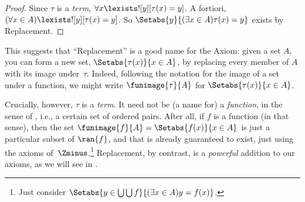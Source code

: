 \documentclass[../../../include/open-logic-section]{subfiles}
\begin{document}
\begin{proof}
Since $\tau$ is a \emph{term}, $\forall x \lexists![y][\tau(x) = y]$.
A fortiori, $(\forall x \in A)\lexists![y][\tau(x) = y]$. So
$\Setabs{y}{(\exists x \in A)\tau(x) = y}$ exists by Replacement.
\end{proof}
\noindent
This suggests that ``Replacement'' is a good name for the Axiom: given
a set $A$, you can form a new set, $\Setabs{\tau(x)}{x \in A}$, by
replacing every member of $A$ with its image under~$\tau$. Indeed,
following the notation for the image of a set under a function, we
might write $\funimage{\tau}{A}$ for $\Setabs{\tau(x)}{x \in A}$.

Crucially, however, $\tau$ is a \emph{term}. It need not be (a name
for) a \emph{function}, in the sense of ,
i.e., a certain set of ordered pairs. After all, if $f$ is a function
(in that sense), then the set $\funimage{f}{A} = \Setabs{f(x)}{x \in
A}$ is just a particular subset of $\ran{f}$, and that is already
guaranteed to exist, just using the axioms of~$\Zminus$.\footnote{Just
consider $\Setabs{y \in \bigcup \bigcup f}{(\exists x \in A)y =
f(x)}$.} Replacement, by contrast, is a \emph{powerful} addition to
our axioms, as we will see in .
\end{document}
